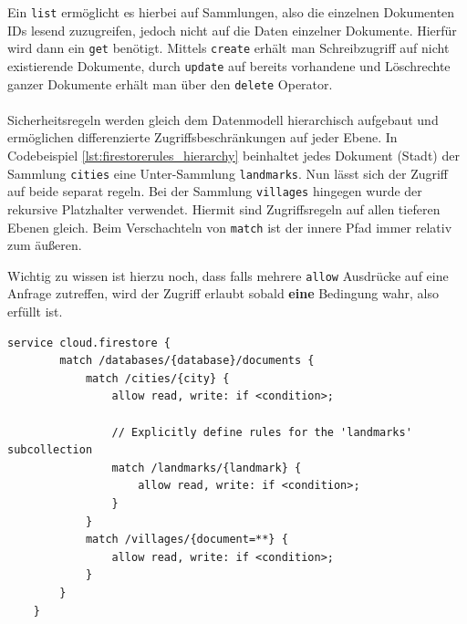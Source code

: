 Ein \texttt{list} ermöglicht es hierbei auf Sammlungen, also die einzelnen Dokumenten IDs lesend zuzugreifen, jedoch nicht auf die Daten einzelner Dokumente. Hierfür wird dann ein \texttt{get} benötigt. 
Mittels \texttt{create} erhält man Schreibzugriff auf nicht existierende Dokumente, durch \texttt{update} auf bereits vorhandene und Löschrechte ganzer Dokumente erhält man über den \texttt{delete} Operator.\\
\\
Sicherheitsregeln werden gleich dem Datenmodell hierarchisch aufgebaut und ermöglichen differenzierte Zugriffsbeschränkungen auf jeder Ebene.
In Codebeispiel \ref{lst:firestorerules_hierarchy} beinhaltet jedes Dokument (Stadt) der Sammlung \texttt{cities} eine Unter-Sammlung \texttt{landmarks}. Nun lässt sich der Zugriff auf beide separat regeln.
Bei der Sammlung \texttt{villages} hingegen wurde der rekursive Platzhalter verwendet. Hiermit sind Zugriffsregeln auf allen tieferen Ebenen gleich.
Beim Verschachteln von \texttt{match} ist der innere Pfad immer relativ zum äußeren.

Wichtig zu wissen ist hierzu noch, dass falls mehrere \texttt{allow} Ausdrücke auf eine Anfrage zutreffen, wird der Zugriff erlaubt sobald \textbf{eine} Bedingung wahr, also erfüllt ist.

\medskip
\begin{lstlisting}[caption=Hierarchische Zugriffsbeschränkung, label=lst:firestorerules_hierarchy]
	service cloud.firestore {
		match /databases/{database}/documents {
			match /cities/{city} {
				allow read, write: if <condition>;
				
				// Explicitly define rules for the 'landmarks' subcollection
				match /landmarks/{landmark} {
					allow read, write: if <condition>;
				}
			}
			match /villages/{document=**} {
				allow read, write: if <condition>;
			}
		}
	}
\end{lstlisting}
\medskip

